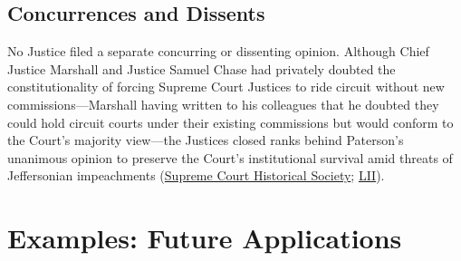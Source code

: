 \documentclass[12pt]{article}
\begin{document}
\subsection{Concurrences and Dissents}

No Justice filed a separate concurring or dissenting opinion. Although Chief Justice Marshall and Justice Samuel Chase had privately doubted the constitutionality of forcing Supreme Court Justices to ride circuit without new commissions---Marshall having written to his colleagues that he doubted they could hold circuit courts under their existing commissions but would conform to the Court's majority view---the Justices closed ranks behind Paterson's unanimous opinion to preserve the Court's institutional survival amid threats of Jeffersonian impeachments (\href{https://supremecourthistory.org/wp-content/uploads/2025/02/Volume-36-Number-3-2011.pdf}{Supreme Court Historical Society}; \href{https://www.law.cornell.edu/supremecourt/text/5/299}{LII}).

\section{Examples: Future Applications}
\end{document}
